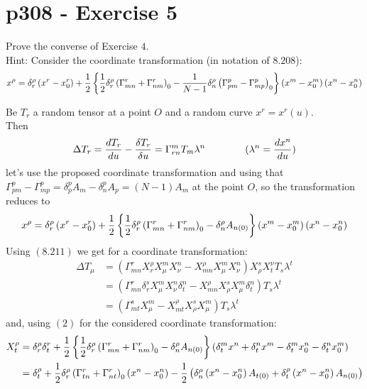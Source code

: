 \section{p308 - Exercise 5}
\begin{tcolorbox}
Prove the converse of Exercise $4$.\\
Hint: Consider the coordinate transformation (in notation of $\mathbf{8.208}$):
$$x^{\rho} = \delta^{\rho}_r\left(x^r-x^r_0\right) + \frac{1}{2}\left\{\frac{1}{2}\delta^{\rho}_r\left(\Gamma^r_{mn} +\Gamma^r_{nm}\right)_0 - \frac{1}{N-1}\delta^{\rho}_n\left(\Gamma^p_{pm}-\Gamma^p_{mp}\right)_0 \right\}\left(x^m-x^m_0\right)\left(x^n-x^n_0\right)$$
\end{tcolorbox}
Be $T_r$ a random tensor at a point $O$ and a random curve $x^r=x^r(u)$.\\ Then 
\begin{align}\Delta T_r=  \dv{T_r}{u}-\fdv{T_r}{u}  =  \Gamma^m_{rn}T_m\lambda^n
\spatie (\lambda^n=\dv{x^n}{u})\end{align} 
let's use the proposed coordinate transformation and using that $\Gamma^p_{pm}-\Gamma^p_{mp} = \delta^p_pA_m - \delta^p_n A_p= \left(N-1\right)A_m$  at the point $O$, so the transformation reduces to
\begin{align}
x^{\rho} = \delta^{\rho}_r\left(x^r-x^r_0\right) + \frac{1}{2}\left\{\frac{1}{2}\delta^{\rho}_r\left(\Gamma^r_{mn} +\Gamma^r_{nm}\right)_0 - \delta^{\rho}_nA_{n(0)} \right\}\left(x^m-x^m_0\right)\left(x^n-x^n_0\right)
\end{align} 
Using $\mathbf{(8.211)}$ we get for a coordinate transformation:
\begin{align}
\Delta T_{\mu} &= \left( \Gamma^r_{mn}X_r^{\rho}X^m_{\mu}X^n_{\nu}- X_{mn}^{\rho}X^m_{\mu}X^n_{\nu} \right)X^s_{\rho}X^{\nu}_tT_s\lambda^t\\
&= \left( \Gamma^r_{mn}\delta_r^{s}X^m_{\mu}X^n_{\nu}\delta_t^{n}- X_{mn}^{\rho}X^s_{\rho}X^m_{\mu}\delta^n_{t} \right)T_s\lambda^t\\
&= \left( \Gamma^s_{mt}X^m_{\mu}- X_{mt}^{\rho}X^s_{\rho}X^m_{\mu} \right)T_s\lambda^t
\end{align}
and, using $(2)$  for the considered coordinate transformation:
\begin{align}
X^{\rho}_t &= \delta^{\rho}_r\delta^{r}_t + \frac{1}{2}\left\{\frac{1}{2}\delta^{\rho}_r\left(\Gamma^r_{mn} +\Gamma^r_{nm}\right)_0 - \delta^{\rho}_nA_{n(0)} \right\}\left(\delta^m_t x^n+\delta^n_t x^m-\delta^m_t x^n_0-\delta^n_t x^m_0\right)\\
&= \delta^{\rho}_t + \frac{1}{2}\delta^{\rho}_r\left(\Gamma^r_{tn} +\Gamma^r_{nt}\right)_0\left(x^n - x^n_0 \right) - \frac{1}{2}\left(\delta^{\rho}_n\left(x^n-x^n_0\right)A_{t(0)}+\delta^{\rho}_t\left(x^n-x^n_0\right)A_{n(0)} \right)
\end{align}
